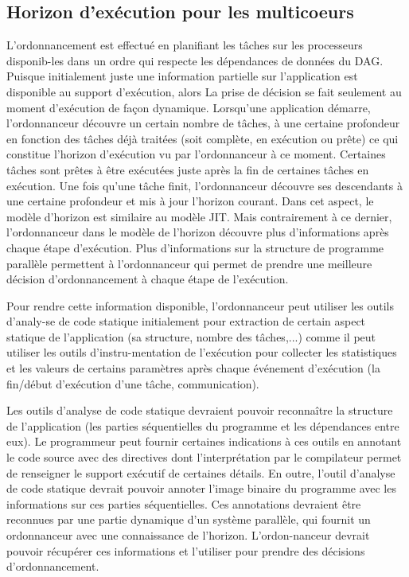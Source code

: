\subsection{Horizon d'exécution pour les multicoeurs \cite{Pla15}}
L'ordonnancement est effectué en planifiant les tâches sur les processeurs disponib-les dans un ordre qui respecte les dépendances de données du DAG. 
%
Puisque initialement juste une information partielle sur l'application est disponible au support d'exécution, alors La prise de décision  se fait seulement au moment d'exécution de façon dynamique. 
Lorsqu'une application démarre, l'ordonnanceur découvre un certain nombre de tâches, à une certaine profondeur en fonction des tâches déjà traitées (soit complète, en exécution ou prête) ce qui constitue l'horizon d'exécution vu par l'ordonnanceur à ce moment. 
Certaines tâches sont prêtes à être exécutées juste après la fin de certaines tâches en exécution. Une fois qu'une tâche finit, l'ordonnanceur découvre ses descendants à une certaine profondeur et mis à jour l'horizon courant. Dans cet aspect, le modèle d'horizon est similaire au modèle JIT. Mais contrairement à ce dernier, l'ordonnanceur dans le modèle de l'horizon découvre plus d'informations après chaque étape d'exécution. Plus d'informations sur la structure de programme parallèle permettent à l’ordonnanceur qui permet de prendre une meilleure décision d'ordonnancement à chaque étape de l'exécution. 

Pour rendre cette information disponible, l'ordonnanceur peut utiliser les outils d'analy-se de code statique initialement pour extraction de certain aspect statique de l'application (sa structure, nombre des tâches,...) comme il peut utiliser les outils d'instru-mentation de l'exécution pour collecter les statistiques et les valeurs de certains paramètres après chaque événement d'exécution (la fin/début d'exécution d'une tâche, communication).

Les outils d'analyse de code statique devraient pouvoir reconnaître la structure de l'application (les parties séquentielles du programme et les dépendances entre eux). 
Le programmeur peut fournir certaines indications à ces outils en annotant le code source avec des directives dont l'interprétation par le compilateur permet de renseigner le support exécutif de certaines détails. 
En outre, l'outil d'analyse de code statique devrait pouvoir annoter l'image binaire du programme avec les informations sur ces parties séquentielles. 
Ces annotations devraient être reconnues par une partie dynamique d'un système parallèle, qui fournit un ordonnanceur avec une connaissance de l'horizon.
%
L'ordon-nanceur devrait pouvoir récupérer ces informations et l'utiliser pour prendre des décisions d'ordonnancement.
%
